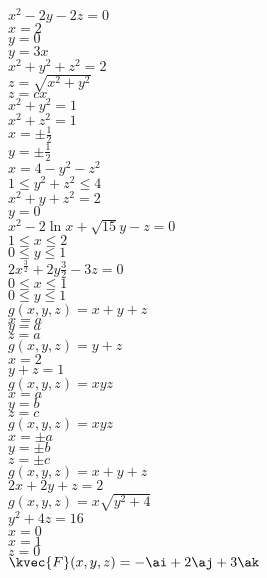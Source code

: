 \(x^2-2y-2z=0\) \\
\(x=2\) \\
\(y=0\) \\
\(y=3x\) \\
\(x^2+y^2+z^2=2\) \\
\(z=\sqrt{x^2+y^2}\)  \\
\(z=cx\)  \\
\(x^2+y^2=1\)  \\
\(x^2+z^2=1\)  \\
\(x=\pm\frac{1}{2}\)  \\
\(y=\pm\frac{1}{2}\)   \\
\(x=4-y^2-z^2\)   \\
\(1\le y^2+z^2\le 4\) \\
\(x^2+y+z^2=2\)  \\
\(y=0\)  \\
\(x^2-2\ln x+\sqrt{15}y-z=0\)  \\
\(1\le x\le 2\) \\
\(0\le y\le 1\) \\
\(2x^{\frac{3}{2}}+2y{\frac{3}{2}}-3z=0\) \\
\(0\le x\le 1\)  \\
\(0\le y\le 1\) \\
\(g(x,y,z)= x+y+z\)  \\
\(x=a\) \\
\(y=a\) \\
\(z=a\)  \\
\(g(x,y,z)= y+z\)  \\
\(x=2\)  \\
\(y+z=1\)  \\
\(g(x,y,z)= xyz\) \\
\(x=a\)  \\
\(y=b\) \\
\(z=c\)  \\
\(g(x,y,z)= xyz\) \\
\(x=\pm a\)  \\
\(y=\pm b\)  \\
\(z=\pm c\)  \\
\(g(x,y,z)=x+y+z\) \\
\(2x+2y+z=2\)  \\
\(g(x,y,z)=x\sqrt{y^2+4}\)  \\
\(y^2+4z=16\)  \\
\(x=0\)  \\
\(x=1\)  \\
\(z=0\)  \\
\(\kvec{F}(x,y,z)= -\ai+2\aj+3\ak\)   \\
